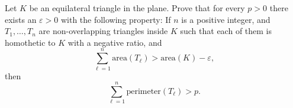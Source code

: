 Let $K$ be an equilateral triangle in the plane. Prove that for every $p>0$ there exists an $\varepsilon>0$ with the following property: If $n$ is a positive integer, and $T_1,\ldots,T_n$ are non-overlapping triangles inside $K$ such that each of them is homothetic to $K$ with a negative ratio, and $$ \sum_{\ell=1}^n \textrm{area}(T_\ell) > \textrm{area}(K)-\varepsilon, $$then $$ \sum_{\ell=1}^n \textrm{perimeter}(T_\ell) > p. $$